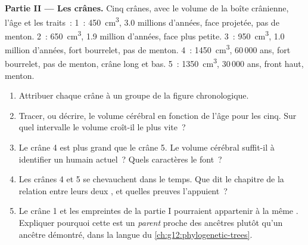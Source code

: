 \begin{problem}
\medskip
\noindent\textbf{Partie II --- Les crânes.}
Cinq crânes, avec le volume de la boîte crânienne, l'âge et les
traits~:
1~: \qty{450}{cm^3}, 3.0 millions d'années, face projetée, pas de
menton.
2~: \qty{650}{cm^3}, 1.9 million d'années, face plus petite.
3~: \qty{950}{cm^3}, 1.0 million d'années, fort bourrelet, pas de
menton.
4~: \qty{1450}{cm^3}, 60\,000 ans, fort bourrelet, pas de menton,
crâne long et bas.
5~: \qty{1350}{cm^3}, 30\,000 ans, front haut, menton.
\begin{enumerate}[resume]
  \item Attribuer chaque crâne à un groupe de la figure chronologique.
  \item Tracer, ou décrire, le volume cérébral en fonction de l'âge
        pour les cinq. Sur quel intervalle le volume croît-il le plus
        vite~?
  \item Le crâne 4 est plus grand que le crâne 5. Le volume cérébral
        suffit-il à identifier un humain actuel~? Quels caractères le
        font~?
  \item Les crânes 4 et 5 se chevauchent dans le temps. Que dit le
        chapitre de la relation entre leurs deux , et
        quelles preuves l'appuient~?
  \item Le crâne 1 et les empreintes de la partie I pourraient
        appartenir à la même . Expliquer pourquoi cette 
        est un \emph{parent} proche des ancêtres plutôt qu'un ancêtre
        démontré, dans la langue du \cref{ch:g12:phylogenetic-trees}.
\end{enumerate}


\end{problem}
